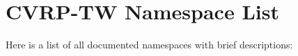 \section{CVRP-TW Namespace List}
Here is a list of all documented namespaces with brief descriptions:\begin{CompactList}
\item{}
\end{CompactList}
